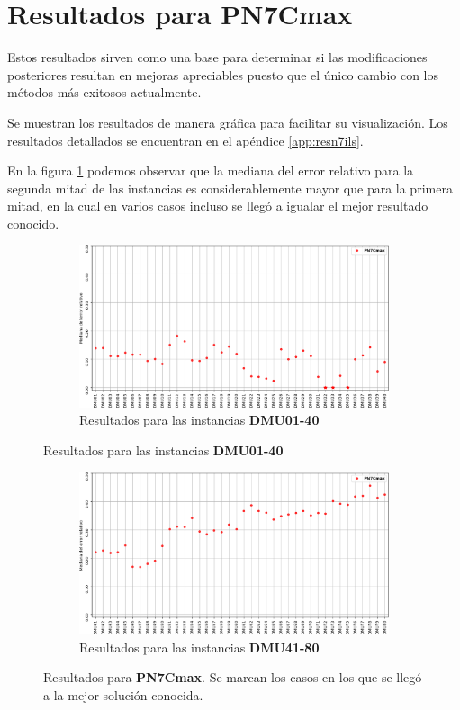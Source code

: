 \section{Resultados para PN7Cmax}
Estos resultados sirven como una base para determinar si las modificaciones posteriores resultan en mejoras apreciables puesto que el único cambio con los métodos más exitosos actualmente.

Se muestran los resultados de manera gráfica para facilitar su visualización. Los resultados detallados se encuentran en el apéndice \ref{app:resn7ils}. 

En la figura \ref{fig:PN7Cmax} podemos observar que la mediana del error relativo para la segunda mitad de las instancias es considerablemente mayor que para la primera mitad, en la cual en varios casos incluso se llegó a igualar el mejor resultado conocido.  
\begin{figure}[hbtp]
    \begin{subfigure}{\textwidth}
        \centering
        \includegraphics[scale=.65]{Imagenes/resn7ils1.png}
        \caption{Resultados para las instancias \textbf{DMU01-40}}
    \end{subfigure}
\end{figure}
\begin{figure}[H]\ContinuedFloat
    \begin{subfigure}{\textwidth}
        \centering
        \includegraphics[scale=.65]{Imagenes/resn7ils2.png}
        \caption{Resultados para las instancias \textbf{DMU41-80}}
    \end{subfigure}
    \caption{Resultados para \textbf{PN7Cmax}. Se marcan los casos en los que se llegó a la mejor solución conocida.}
    \label{fig:PN7Cmax}
\end{figure}

